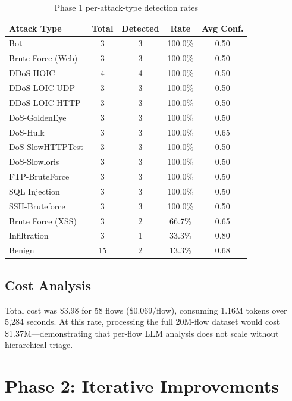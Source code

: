 \documentclass[12pt, a4paper, oneside]{report}
\begin{document}
\begin{table}[H]
\centering
\caption{Phase 1 per-attack-type detection rates}
\label{tab:phase1-perattack}
\begin{tabular}{@{}lcccc@{}}
\toprule
\textbf{Attack Type} & \textbf{Total} & \textbf{Detected} & \textbf{Rate}
  & \textbf{Avg Conf.} \\
\midrule
Bot                    & 3 & 3 & 100.0\% & 0.50 \\
Brute Force (Web)      & 3 & 3 & 100.0\% & 0.50 \\
DDoS-HOIC              & 4 & 4 & 100.0\% & 0.50 \\
DDoS-LOIC-UDP          & 3 & 3 & 100.0\% & 0.50 \\
DDoS-LOIC-HTTP         & 3 & 3 & 100.0\% & 0.50 \\
DoS-GoldenEye          & 3 & 3 & 100.0\% & 0.50 \\
DoS-Hulk               & 3 & 3 & 100.0\% & 0.65 \\
DoS-SlowHTTPTest       & 3 & 3 & 100.0\% & 0.50 \\
DoS-Slowloris          & 3 & 3 & 100.0\% & 0.50 \\
FTP-BruteForce         & 3 & 3 & 100.0\% & 0.50 \\
SQL Injection          & 3 & 3 & 100.0\% & 0.50 \\
SSH-Bruteforce         & 3 & 3 & 100.0\% & 0.50 \\
\midrule
Brute Force (XSS)      & 3 & 2 &  66.7\% & 0.65 \\
Infiltration           & 3 & 1 &  33.3\% & 0.80 \\
\midrule
Benign                 & 15 & 2 &  13.3\% & 0.68 \\
\bottomrule
\end{tabular}
\end{table}

\subsection{Cost Analysis}

Total cost was \$3.98 for 58 flows (\$0.069/flow), consuming 1.16M tokens over
5,284 seconds. At this rate, processing the full 20M-flow dataset would cost
\$1.37M---demonstrating that per-flow LLM analysis does not scale without
hierarchical triage.


\section{Phase 2: Iterative Improvements}
\label{sec:phase2-results-draft}
\end{document}
